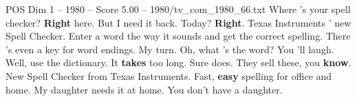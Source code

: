 \begin{textsample}{POS Dim 1 – 1980 – Score 5.00 – 1980/tv\_com\_1980\_66.txt}  \label{ex:f1_pos_043}
Where 's your spell checker? \textbf{Right} here.
But I need it back.
Today? \textbf{Right}.
Texas Instruments ' new Spell Checker.
Enter a word the way it sounds and get the correct spelling.
There 's even a key for word endings.
My turn.
Oh, what 's the word?
You 'll laugh.
Well, use the dictionary.
It \textbf{takes} too long.
Sure does.
They sell these, you \textbf{know}.
New Spell Checker from Texas Instruments.
Fast, \textbf{easy} spelling for office and home.
My daughter needs it at home.
You don't have a daughter.

\end{textsample}
